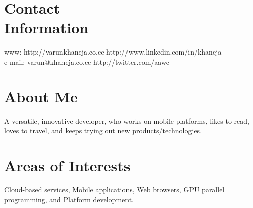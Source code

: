 \documentclass[margin,line]{resume}
\begin{document}
	\begin{resume}
	
	\section{\mysidestyle Contact\\Information}
	
	www: http://varunkhaneja.co.cc \hfill http://www.linkedin.com/in/khaneja\vspace{0mm}\\\vspace{0mm}%
	e-mail: varun@khaneja.co.cc    \hfill http://twitter.com/aawc\vspace{0mm}%

	\section{\mysidestyle About Me}
	A versatile, innovative developer, who works on mobile platforms, likes to read, loves to travel, and keeps trying out new products/technologies.

	\section{\mysidestyle Areas of Interests}
	Cloud-based services, Mobile applications, Web browsers, GPU parallel programming, and Platform development.


\end{resume}
\end{document}
